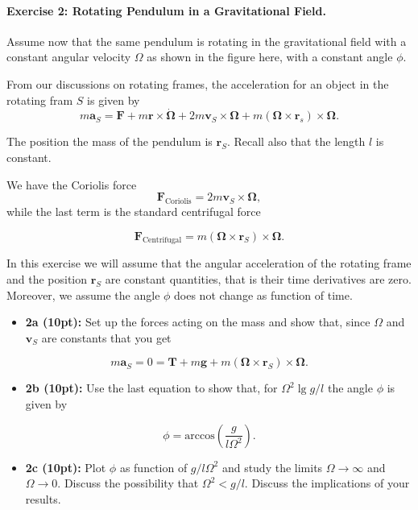 \documentclass[%
oneside,                 %
final,                   %
10pt]{article}
\begin{document}
\noindent
\paragraph{Exercise 2: Rotating Pendulum in a Gravitational Field.}
Assume now that the same pendulum is rotating in the gravitational field with a constant angular velocity $\Omega$ as shown in the figure here, with a constant angle $\phi$.

From our discussions on rotating frames, the acceleration for an object in the rotating fram $S$  is given by
\[
m\bm{a}_{S}=\bm{F}+m\bm{r}\times\dot{\bm{\Omega}}+2m\bm{v}_S\times\bm{\Omega}+m(\bm{\Omega}\times\bm{r}_s)\times\bm{\Omega}.
\]

The position the mass of the pendulum is $\bm{r}_S$. Recall also that the length $l$ is constant.

We have the Coriolis force
\[
\bm{F}_{\mathrm{Coriolis}}=2m\bm{v}_S\times\bm{\Omega},
\]
while the last term is the standard centrifugal force

\[
\bm{F}_{\mathrm{Centrifugal}}=m\left(\bm{\Omega}\times\bm{r}_S\right)\times\bm{\Omega}.
\]

In this exercise  we will assume that the angular acceleration of the rotating frame and the position $\bm{r}_S$ are  constant quantities, that is their time derivatives are zero. Moreover, we assume the angle $\phi$ does not change as function of time.

\begin{itemize}
\item \textbf{2a (10pt):} Set up the forces acting on the mass and show that, since $\Omega$ and $\bm{v}_S$ are constants that you get 
\end{itemize}

\noindent
\[
m\bm{a}_{S}=0=\bm{T}+m\bm{g}+m(\bm{\Omega}\times\bm{r}_S)\times\bm{\Omega}.
\]

\begin{itemize}
\item \textbf{2b (10pt):} Use the last equation to show that, for $\Omega^2 \lg g/l$  the angle $\phi$ is given by
\end{itemize}

\noindent
\[
\phi=\mathrm{arccos}\left(\frac{g}{l\Omega^2}\right).
\]

\begin{itemize}
\item \textbf{2c (10pt):} Plot $\phi$ as function of $g/l\Omega^2$ and study the limits $\Omega\rightarrow \infty$ and $\Omega\rightarrow 0$. Discuss  the possibility that $\Omega^2 < g/l$. Discuss the implications of your results. 
\end{itemize}

\noindent

\end{document}
